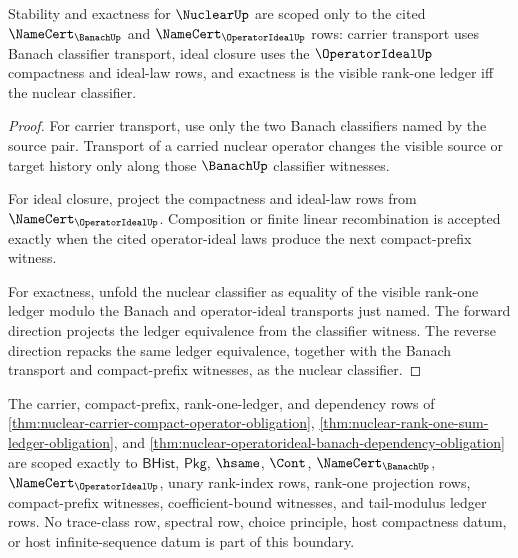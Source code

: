 \begin{theorem}
\label{thm:nuclear-operatorideal-banach-dependency-obligation}
Stability and exactness for $\NuclearUp$ are scoped only to the cited $\NameCert_{\BanachUp}$ and $\NameCert_{\OperatorIdealUp}$ rows: carrier transport uses Banach classifier transport, ideal closure uses the $\OperatorIdealUp$ compactness and ideal-law rows, and exactness is the visible rank-one ledger iff the nuclear classifier.
\end{theorem}

\begin{proof}
For carrier transport, use only the two Banach classifiers named by the source pair. Transport of a carried nuclear operator changes the visible source or target history only along those $\BanachUp$ classifier witnesses.

For ideal closure, project the compactness and ideal-law rows from $\NameCert_{\OperatorIdealUp}$. Composition or finite linear recombination is accepted exactly when the cited operator-ideal laws produce the next compact-prefix witness.

For exactness, unfold the nuclear classifier as equality of the visible rank-one ledger modulo the Banach and operator-ideal transports just named. The forward direction projects the ledger equivalence from the classifier witness. The reverse direction repacks the same ledger equivalence, together with the Banach transport and compact-prefix witnesses, as the nuclear classifier.
\end{proof}

\begin{theorem}
\label{thm:nuclear-scoped-bhist-boundary}
The carrier, compact-prefix, rank-one-ledger, and dependency rows of \autoref{thm:nuclear-carrier-compact-operator-obligation}, \autoref{thm:nuclear-rank-one-sum-ledger-obligation}, and \autoref{thm:nuclear-operatorideal-banach-dependency-obligation} are scoped exactly to $\mathsf{BHist}$, $\mathsf{Pkg}$, $\hsame$, $\Cont$, $\NameCert_{\BanachUp}$, $\NameCert_{\OperatorIdealUp}$, unary rank-index rows, rank-one projection rows, compact-prefix witnesses, coefficient-bound witnesses, and tail-modulus ledger rows. No trace-class row, spectral row, choice principle, host compactness datum, or host infinite-sequence datum is part of this boundary.
\end{theorem}

